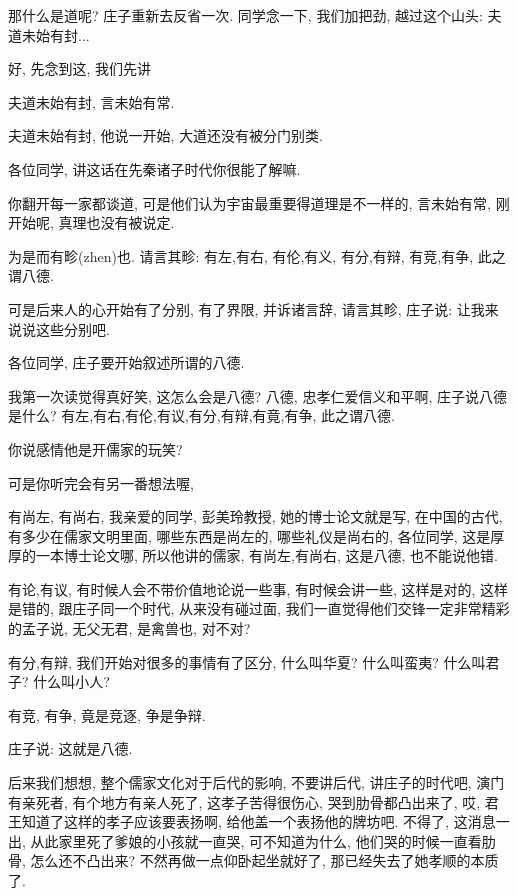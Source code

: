 \documentclass[11pt]{article}
\begin{document}
那什么是道呢? 庄子重新去反省一次. 同学念一下, 我们加把劲, 越过这个山头:  夫道未始有封... 

好, 先念到这, 我们先讲

\begin{center}
	{\color{magenta} 夫道未始有封, 言未始有常.}
\end{center}

\vspace{-0.5cm}

{\color{blue} 夫道未始有封,} 他说一开始, 大道还没有被分门别类. 

各位同学, 讲这话在先秦诸子时代你很能了解嘛. 

你翻开每一家都谈道, 可是他们认为宇宙最重要得道理是不一样的, {\color{blue} 言未始有常}, 刚开始呢, 真理也没有被说定.
\begin{center}
	{\color{magenta} 为是而有畛(zhen)也. 请言其畛: 有左,有右, 有伦,有义, 有分,有辩, 有竞,有争, 此之谓八德.}
\end{center}

\vspace{-0.5cm}

可是后来人的心开始有了分别, 有了界限, 并诉诸言辞, {\color{blue} 请言其畛}, 庄子说: 让我来说说这些分别吧.

各位同学, 庄子要开始叙述所谓的八德.

我第一次读觉得真好笑, 这怎么会是八德? 八德, 忠孝仁爱信义和平啊, 庄子说八德是什么? 有左,有右,有伦,有议,有分,有辩,有竟,有争, 此之谓八德.

你说感情他是开儒家的玩笑?   

可是你听完会有另一番想法喔, 

有尚左, 有尚右, 我亲爱的同学, 彭美玲教授, 她的博士论文就是写, 在中国的古代, 有多少在儒家文明里面, 哪些东西是尚左的, 哪些礼仪是尚右的, 各位同学, 这是厚厚的一本博士论文哪, 所以他讲的儒家, 有尚左,有尚右, 这是八德, 也不能说他错. 

有论,有议, 有时候人会不带价值地论说一些事, 有时候会讲一些, 这样是对的, 这样是错的, 跟庄子同一个时代, 从来没有碰过面, 我们一直觉得他们交锋一定非常精彩的孟子说, 无父无君, 是禽兽也, 对不对?

有分,有辩, 我们开始对很多的事情有了区分, 什么叫华夏? 什么叫蛮夷? 什么叫君子? 什么叫小人? 

有竞, 有争, 竟是竞逐, 争是争辩.

庄子说: 这就是八德.  

后来我们想想, 整个儒家文化对于后代的影响, 不要讲后代, 讲庄子的时代吧, 演门有亲死者, 有个地方有亲人死了, 这孝子苦得很伤心, 哭到肋骨都凸出来了, 哎, 君王知道了这样的孝子应该要表扬啊, 给他盖一个表扬他的牌坊吧. 不得了, 这消息一出, 从此家里死了爹娘的小孩就一直哭, 可不知道为什么, 他们哭的时候一直看肋骨, 怎么还不凸出来?  不然再做一点仰卧起坐就好了, 那已经失去了她孝顺的本质了.
\end{document}
